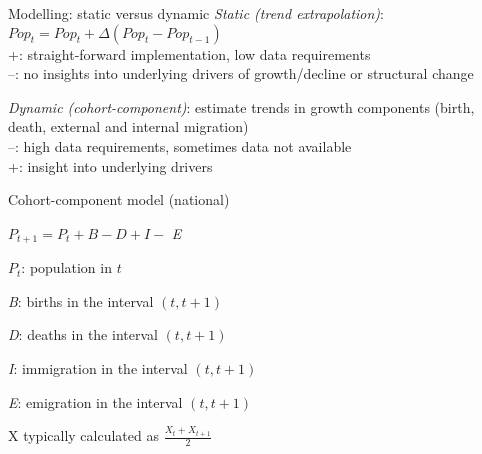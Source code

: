 \documentclass[final, 12pt, aspectratio=169, xcolor={dvipsnames}]{beamer}
\begin{document}
\begin{frame}{Modelling: static versus dynamic}
  \textit{Static (trend extrapolation)}: $Pop_{t} = Pop_{t} + \Delta (Pop_{t} - Pop_{t-1})$\\

    +: straight-forward implementation, low data requirements \\
    --: no insights into underlying drivers of growth/decline or structural change
    
 \textit{Dynamic (cohort-component)}: estimate trends in growth components (birth, death, external and internal migration)     \\

 --: high data requirements, sometimes data not available \\
 +: insight into underlying drivers
\end{frame}


\begin{frame}{Cohort-component model (national)}
  
    $P_{t+1} = P_{t} + B - D + I - $ \textit{E}
    
  \begin{description}
  \item \textit{$P_{t}$}: population in $t$ \\
  \item \textit{B}: births in the interval $(t, t+1 )$ \\
  \item \textit{D}: deaths in the interval $(t, t+1 )$ \\
  \item \textit{I}: immigration in the interval $(t, t+1 )$ \\
  \item \textit{E}: emigration in the interval $(t, t+1 )$
  \end{description}
\vspace{1cm}
  X typically calculated as $\frac{X_{t} + X_{t+1}}{2}$
  
\end{frame}
\end{document}
